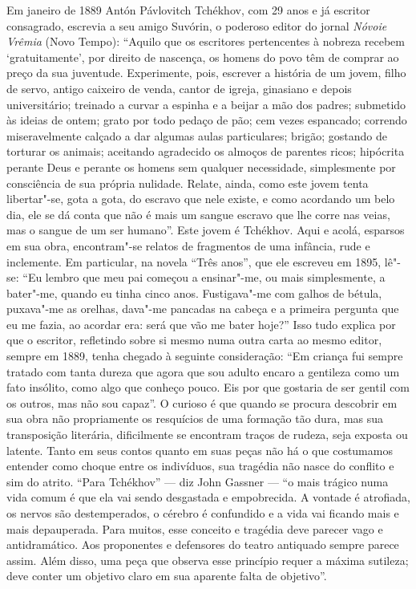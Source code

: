 {{Em janeiro de 1889 Antón Pávlovitch Tchékhov, com 29 anos e já escritor
consagrado, escrevia a seu amigo Suvórin, o poderoso editor do jornal
\emph{Nóvoie Vrêmia} (Novo Tempo): ``Aquilo que os escritores pertencentes à
nobreza recebem `gratuitamente', por direito de nascença, os homens do
povo têm de comprar ao preço da sua juventude. Experimente, pois,
escrever a história de um jovem, filho de servo, antigo caixeiro de
venda, cantor de igreja, ginasiano e depois universitário; treinado a
curvar a espinha e a beijar a mão dos padres; submetido às ideias de
ontem; grato por todo pedaço de pão; cem vezes espancado; correndo
miseravelmente calçado a dar algumas aulas particulares; brigão;
gostando de torturar os animais; aceitando agradecido os almoços de
parentes ricos; hipócrita perante Deus e perante os homens sem qualquer
necessidade, simplesmente por consciência de sua própria nulidade.
Relate, ainda, como este jovem tenta libertar"-se, gota a gota, do
escravo que nele existe, e como acordando um belo dia, ele se dá conta
que não é mais um sangue escravo que lhe corre nas veias, mas o sangue
de um ser humano''. Este jovem é Tchékhov. Aqui e acolá, esparsos em sua
obra, encontram"-se relatos de fragmentos de uma infância, rude e
inclemente. Em particular, na novela ``Três anos'', que ele escreveu em
1895, lê"-se: ``Eu lembro que meu pai começou a ensinar"-me, ou mais
simplesmente, a bater"-me, quando eu tinha cinco anos. Fustigava"-me com
galhos de bétula, puxava"-me as orelhas, dava"-me pancadas na cabeça e a
primeira pergunta que eu me fazia, ao acordar era: será que vão me
bater hoje?'' Isso tudo explica por que o escritor, refletindo sobre si
mesmo numa outra carta ao mesmo editor, sempre em 1889, tenha chegado à
seguinte consideração: ``Em criança fui sempre tratado com tanta dureza
que agora que sou adulto encaro a gentileza como um fato insólito, como
algo que conheço pouco. Eis por que gostaria de ser gentil com os
outros, mas não sou capaz''. O curioso é que quando se procura descobrir
em sua obra não propriamente os resquícios de uma formação tão dura, mas
sua transposição literária, dificilmente se encontram traços de rudeza,
seja exposta ou latente. Tanto em seus contos quanto em suas peças não
há o que costumamos entender como choque entre os indivíduos, sua
tragédia não nasce do conflito e sim do atrito. ``Para Tchékhov'' --- diz
John Gassner --- ``o mais trágico numa vida comum é que ela vai sendo
desgastada e empobrecida. A vontade é atrofiada, os nervos são
destemperados, o cérebro é confundido e a vida vai ficando mais e mais
depauperada. Para muitos, esse conceito e tragédia deve parecer vago e
antidramático. Aos proponentes e defensores do teatro antiquado sempre
parece assim. Além disso, uma peça que observa esse princípio requer a
máxima sutileza; deve conter um objetivo claro em sua aparente falta de
objetivo''.

}}
